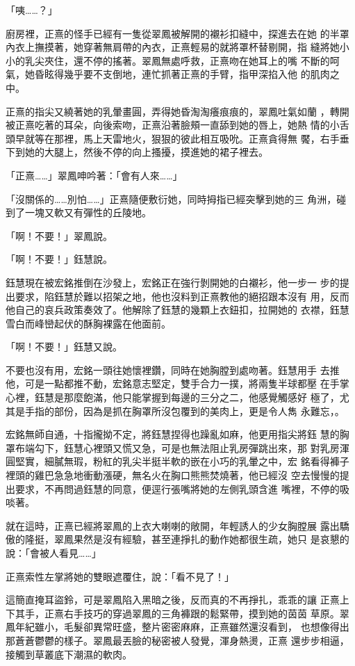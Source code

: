 「咦……？」

廚房裡，正熹的怪手已經有一隻從翠鳳被解開的襯衫扣縫中，探進去在她
的半罩內衣上撫摸著，她穿著無肩帶的內衣，正熹輕易的就將罩杯替剔開，指
縫將她小小的乳尖夾住，還不停的搖著。翠鳳無處呼救，正熹吻在她耳上的嘴
不斷的呵氣，她昏眩得幾乎要不支倒地，連忙抓著正熹的手臂，指甲深掐入他
的肌肉之中。

正熹的指尖又繞著她的乳暈畫圓，弄得她昏淘淘癢痕痕的，翠鳳吐氣如蘭
，轉開被正熹吃著的耳朵，向後索吻，正熹沿著臉頰一直舔到她的唇上，她熱
情的小舌頭早就等在那裡，馬上天雷地火，狠狠的彼此相互吸吮。正熹貪得無
饜，右手垂下到她的大腿上，然後不停的向上搔擾，摸進她的裙子裡去。

「正熹……」翠鳳呻吟著：「會有人來……」

「沒關係的……別怕……」正熹隨便敷衍她，同時拇指已經突擊到她的三
角洲，碰到了一塊又軟又有彈性的丘陵地。

「啊！不要！」翠鳳說。

「啊！不要！」鈺慧說。

鈺慧現在被宏銘推倒在沙發上，宏銘正在強行剝開她的白襯衫，他一步一
步的提出要求，陷鈺慧於難以招架之地，他也沒料到正熹教他的絕招跟本沒有
用，反而他自己的哀兵政策奏效了。他解除了鈺慧的幾顆上衣鈕扣，拉開她的
衣襟，鈺慧雪白而峰巒起伏的酥胸裸露在他面前。

「啊！不要！」鈺慧又說。

不要也沒有用，宏銘一頭往她懷裡鑽，同時在她胸膛到處吻著。鈺慧用手
去推他，可是一點都推不動，宏銘意志堅定，雙手合力一撲，將兩隻半球都壓
在手掌心裡，鈺慧是那麼飽滿，他只能掌握到每邊的三分之二，他感覺觸感好
極了，尤其是手指的部份，因為是抓在胸罩所沒包覆到的美肉上，更是令人雋
永難忘，。

宏銘無師自通，十指攏拗不定，將鈺慧捏得也躁亂如麻，他更用指尖將鈺
慧的胸罩布端勾下，鈺慧心裡頭又慌又急，可是也無法阻止乳房彈跳出來，那
對乳房渾圓堅實，細膩無瑕，粉紅的乳尖半挺半軟的嵌在小巧的乳暈之中，宏
銘看得褲子裡頭的雞巴急急地衝動漲硬，無名火在胸口熊熊焚燒著，他已經沒
空去慢慢的提出要求，不再問過鈺慧的同意，便逕行張嘴將她的左側乳頭含進
嘴裡，不停的吸啖著。

就在這時，正熹已經將翠鳳的上衣大喇喇的敞開，年輕誘人的少女胸膛展
露出驕傲的隆挺，翠鳳果然是沒有經驗，甚至連掙扎的動作她都很生疏，她只
是哀懇的說：「會被人看見……」

正熹索性左掌將她的雙眼遮覆住，說：「看不見了！」

這簡直掩耳盜鈴，可是翠鳳陷入黑暗之後，反而真的不再掙扎，乖乖的讓
正熹上下其手，正熹右手技巧的穿過翠鳳的三角褲跟的鬆緊帶，摸到她的茵茵
草原。翠鳳年紀雖小，毛髮卻異常旺盛，整片密密麻麻，正熹雖然還沒看到，
也想像得出那蒼蒼鬱鬱的樣子。翠鳳最丟臉的秘密被人發覺，渾身熱燙，正熹
還步步相逼，接觸到草叢底下潮濕的軟肉。

